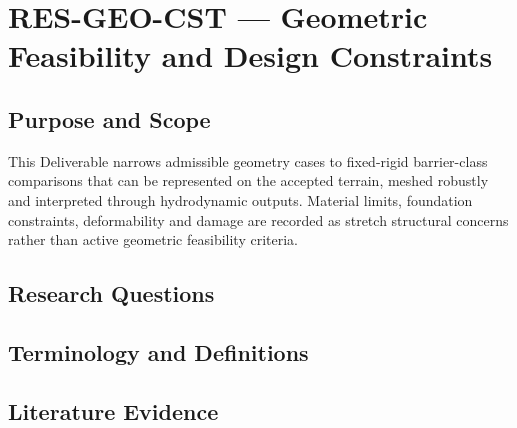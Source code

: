 
\section{RES-GEO-CST --- Geometric Feasibility and Design Constraints}
\label{sec:res-geo-cst}

\subsection{Purpose and Scope}
\label{sec:res-geo-cst-purpose}

This Deliverable narrows admissible geometry cases to fixed-rigid
barrier-class comparisons that can be represented on the accepted
terrain, meshed robustly and interpreted through hydrodynamic outputs.
Material limits, foundation constraints, deformability and damage are
recorded as stretch structural concerns rather than active geometric
feasibility criteria.

\subsection{Research Questions}
\label{sec:res-geo-cst-research-questions}


\subsection{Terminology and Definitions}
\label{sec:res-geo-cst-definitions}


\subsection{Literature Evidence}
\label{sec:res-geo-cst-literature-evidence}


